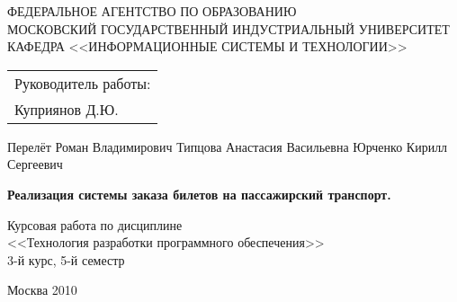 \thispagestyle{empty}

\vspace*{-\headheight}\vspace*{-\headsep}

{\centering
{\sc
ФЕДЕРАЛЬНОЕ АГЕНТСТВО ПО ОБРАЗОВАНИЮ\\
МОСКОВСКИЙ ГОСУДАРСТВЕННЫЙ ИНДУСТРИАЛЬНЫЙ УНИВЕРСИТЕТ\\
КАФЕДРА <<ИНФОРМАЦИОННЫЕ СИСТЕМЫ И ТЕХНОЛОГИИ>>\\
}


\vspace{4cm plus 1mm minus 1mm}

\begin{flushright}
\begin{tabular}{l}
Руководитель работы:\\
Куприянов Д.Ю.
\end{tabular}
\end{flushright}

\vspace{3cm plus 1mm minus 1mm}

Перелёт Роман Владимирович
Типцова Анастасия Васильевна
Юрченко Кирилл Сергеевич

\vspace{1cm plus 1mm minus 1mm}
{\large\bf
Реализация системы заказа билетов на пассажирский транспорт.
}

\vspace{1cm plus 1mm minus 1mm}

Курсовая работа по дисциплине\\
<<Технология разработки программного обеспечения>>\\
3-й курс, 5-й семестр

\vfill

Москва 2010

}

\newpage
\endinput
